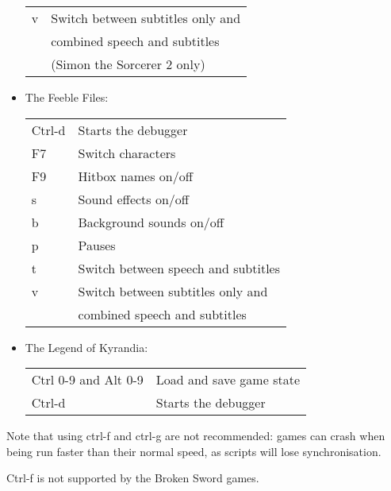\begin{itemize}
\begin{tabular}{ll}
    v                      & Switch between subtitles only and\\
                           & combined speech and subtitles\\
                           & (Simon the Sorcerer 2 only)\\
  \end{tabular}
\item The Feeble Files:\\
  \begin{tabular}{ll}
    Ctrl-d                 & Starts the debugger\\
    F7                     & Switch characters\\
    F9                     & Hitbox names on/off\\
    s                      & Sound effects on/off\\
    b                      & Background sounds on/off\\
    p                      & Pauses\\
    t                      & Switch between speech and subtitles\\
    v                      & Switch between subtitles only and\\
                           & combined speech and subtitles\\
  \end{tabular}
\item The Legend of Kyrandia:\\
  \begin{tabular}{ll}
    Ctrl 0-9 and Alt 0-9   & Load and save game state\\
    Ctrl-d                 & Starts the debugger\\
  \end{tabular}
\end{itemize}

Note that using ctrl-f and ctrl-g are not recommended: games can crash when
being run faster than their normal speed, as scripts will lose synchronisation.

Ctrl-f is not supported by the Broken Sword games.


